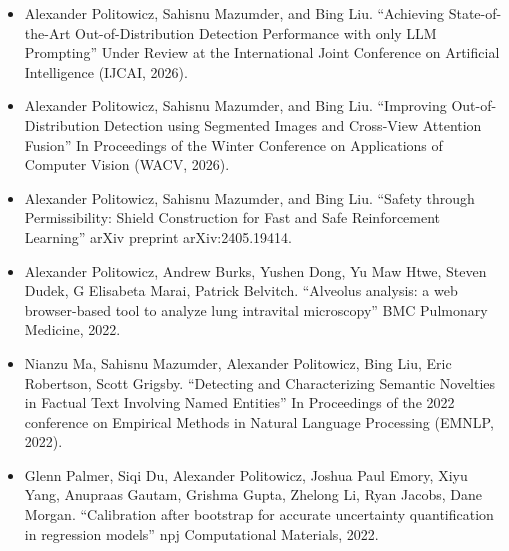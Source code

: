 \begin{singlespace}
\begin{description}[labelwidth=4cm,leftmargin=4.2cm,itemsep=1em]
        \item[PUBLICATIONS]
            \begin{itemize}[label={},listparindent=0pt,itemindent=0pt,leftmargin=0pt,itemsep=1em,parsep=0pt,topsep=0pt,partopsep=0pt]

                \item Alexander Politowicz, Sahisnu Mazumder, and Bing Liu. %
                ``Achieving State-of-the-Art Out-of-Distribution Detection Performance with only LLM Prompting'' %
                Under Review at the International Joint Conference on Artificial Intelligence (IJCAI, 2026).

                \item Alexander Politowicz, Sahisnu Mazumder, and Bing Liu. %
                ``Improving Out-of-Distribution Detection using Segmented Images and Cross-View Attention Fusion'' %
                In Proceedings of the Winter Conference on Applications of Computer Vision (WACV, 2026).

                \item Alexander Politowicz, Sahisnu Mazumder, and Bing Liu. %
                ``Safety through Permissibility: Shield Construction for Fast and Safe Reinforcement Learning'' %
                arXiv preprint arXiv:2405.19414.

                \item Alexander Politowicz, Andrew Burks, Yushen Dong, Yu Maw Htwe, Steven Dudek, G Elisabeta Marai, Patrick Belvitch. %
                ``Alveolus analysis: a web browser-based tool to analyze lung intravital microscopy'' %
                BMC Pulmonary Medicine, 2022.
                
                \item Nianzu Ma, Sahisnu Mazumder, Alexander Politowicz, Bing Liu, Eric Robertson, Scott Grigsby.
                ``Detecting and Characterizing Semantic Novelties in Factual Text Involving Named Entities''
                In Proceedings of the 2022 conference on Empirical Methods in Natural Language Processing (EMNLP, 2022).

                \item Glenn Palmer, Siqi Du, Alexander Politowicz, Joshua Paul Emory, Xiyu Yang, Anupraas Gautam, Grishma Gupta, Zhelong Li, Ryan Jacobs, Dane Morgan.
                ``Calibration after bootstrap for accurate uncertainty quantification in regression models''
                npj Computational Materials, 2022.


\end{itemize}
\end{description}
\end{singlespace}
